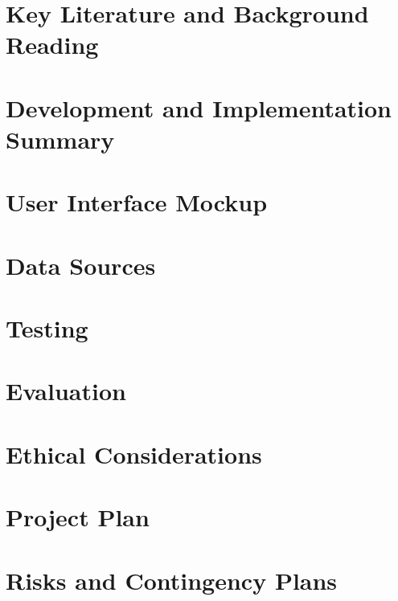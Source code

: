 \documentclass[journal,10pt]{IEEEtran}
\begin{document}
\section{Key Literature and Background Reading}
\cite{borji2023categorical}
\section{Development and Implementation Summary}
\section{User Interface Mockup}
\section{Data Sources}
\section{Testing}
\section{Evaluation}
\section{Ethical Considerations}
\section{Project Plan}
\section{Risks and Contingency Plans}



\end{document}

